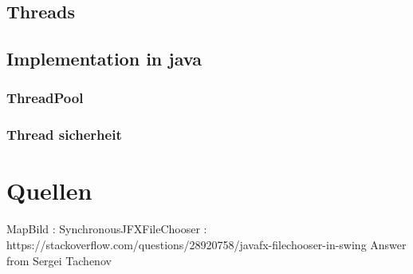 \subsection{Threads}

\subsection{Implementation in java}

\subsubsection{ThreadPool}

\subsubsection{Thread sicherheit}

\section{Quellen}
MapBild :
SynchronousJFXFileChooser : https://stackoverflow.com/questions/28920758/javafx-filechooser-in-swing
Answer from Sergei Tachenov